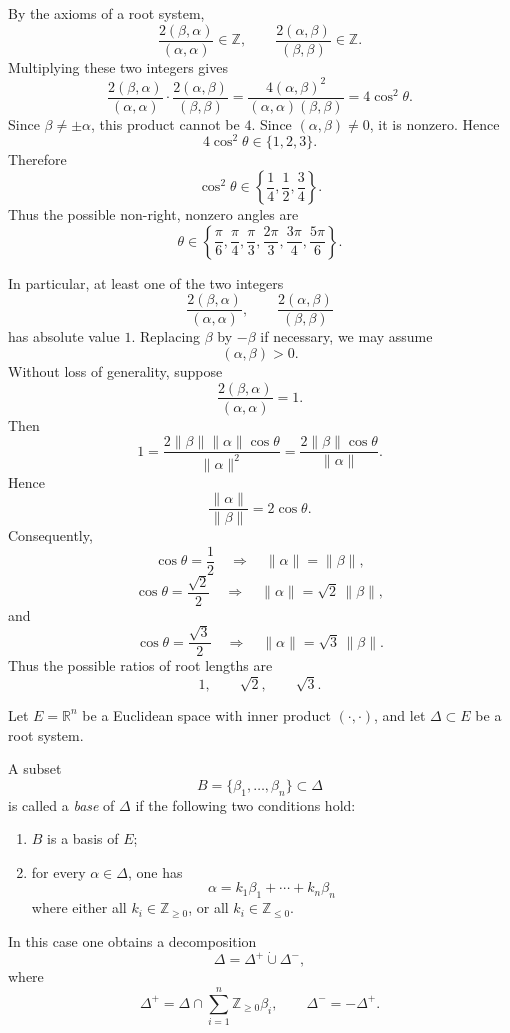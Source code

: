 By the axioms of a root system,
\[
    \frac{2(\beta,\alpha)}{(\alpha,\alpha)}\in\mathbb{Z},
    \qquad
    \frac{2(\alpha,\beta)}{(\beta,\beta)}\in\mathbb{Z}.
\]
Multiplying these two integers gives
\[
    \frac{2(\beta,\alpha)}{(\alpha,\alpha)}
    \cdot
    \frac{2(\alpha,\beta)}{(\beta,\beta)}
    =
    \frac{4(\alpha,\beta)^2}{(\alpha,\alpha)(\beta,\beta)}
    =
    4\cos^2\theta.
\]
Since \(\beta\neq \pm\alpha\), this product cannot be \(4\). Since
\((\alpha,\beta)\neq 0\), it is nonzero. Hence
\[
    4\cos^2\theta\in\{1,2,3\}.
\]
Therefore
\[
    \cos^2\theta\in
    \left\{
    \frac14,\frac12,\frac34
    \right\}.
\]
Thus the possible non-right, nonzero angles are
\[
    \theta
    \in
    \left\{
    \frac{\pi}{6},
    \frac{\pi}{4},
    \frac{\pi}{3},
    \frac{2\pi}{3},
    \frac{3\pi}{4},
    \frac{5\pi}{6}
    \right\}.
\]

In particular, at least one of the two integers
\[
    \frac{2(\beta,\alpha)}{(\alpha,\alpha)},
    \qquad
    \frac{2(\alpha,\beta)}{(\beta,\beta)}
\]
has absolute value \(1\). Replacing \(\beta\) by \(-\beta\) if necessary, we may
assume
\[
    (\alpha,\beta)>0.
\]
Without loss of generality, suppose
\[
    \frac{2(\beta,\alpha)}{(\alpha,\alpha)}=1.
\]
Then
\[
    1
    =
    \frac{2\|\beta\|\|\alpha\|\cos\theta}{\|\alpha\|^2}
    =
    \frac{2\|\beta\|\cos\theta}{\|\alpha\|}.
\]
Hence
\[
    \frac{\|\alpha\|}{\|\beta\|}
    =
    2\cos\theta.
\]
Consequently,
\[
    \cos\theta=\frac12
    \quad\Longrightarrow\quad
    \|\alpha\|=\|\beta\|,
\]
\[
    \cos\theta=\frac{\sqrt2}{2}
    \quad\Longrightarrow\quad
    \|\alpha\|=\sqrt2\,\|\beta\|,
\]
and
\[
    \cos\theta=\frac{\sqrt3}{2}
    \quad\Longrightarrow\quad
    \|\alpha\|=\sqrt3\,\|\beta\|.
\]
Thus the possible ratios of root lengths are
\[
    1,\qquad \sqrt2,\qquad \sqrt3.
\]

Let \(E=\mathbb{R}^n\) be a Euclidean space with inner product
\((\cdot,\cdot)\), and let \(\Delta\subset E\) be a root system.

\begin{definition}[Base]
    A subset
    \[
        B=\{\beta_1,\ldots,\beta_n\}\subset \Delta
    \]
    is called a \emph{base} of \(\Delta\) if the following two conditions hold:
    \begin{enumerate}
        \item \(B\) is a basis of \(E\);
        \item for every \(\alpha\in\Delta\), one has
              \[
                  \alpha=k_1\beta_1+\cdots+k_n\beta_n
              \]
              where either all \(k_i\in\mathbb{Z}_{\geq 0}\), or all
              \(k_i\in\mathbb{Z}_{\leq 0}\).
    \end{enumerate}
    In this case one obtains a decomposition
    \[
        \Delta=\Delta^+\dot\cup \Delta^-,
    \]
    where
    \[
        \Delta^+
        =
        \Delta\cap
        \sum_{i=1}^n \mathbb{Z}_{\geq 0}\beta_i,
        \qquad
        \Delta^-=-\Delta^+.
    \]
\end{definition}

